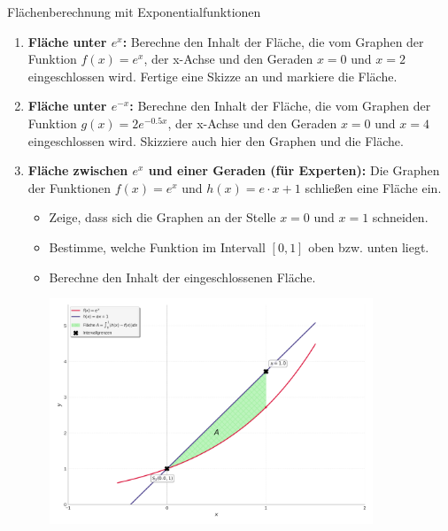 \begin{aufgabenumgebung}{Flächenberechnung mit Exponentialfunktionen}
\begin{enumerate}
    \item \textbf{Fläche unter $e^x$:}
        Berechne den Inhalt der Fläche, die vom Graphen der Funktion $f(x) = e^x$, der x-Achse und den Geraden $x=0$ und $x=2$ eingeschlossen wird. Fertige eine Skizze an und markiere die Fläche.
    \item \textbf{Fläche unter $e^{-x}$:}
        Berechne den Inhalt der Fläche, die vom Graphen der Funktion $g(x) = 2e^{-0.5x}$, der x-Achse und den Geraden $x=0$ und $x=4$ eingeschlossen wird. Skizziere auch hier den Graphen und die Fläche.
    \item \textbf{Fläche zwischen $e^x$ und einer Geraden (für Experten):}
        Die Graphen der Funktionen $f(x) = e^x$ und $h(x) = e\cdot x + 1$ schließen eine Fläche ein.
        \begin{itemize}
            \item Zeige, dass sich die Graphen an der Stelle $x=0$ und $x=1$ schneiden.
            \item Bestimme, welche Funktion im Intervall $[0,1]$ oben bzw. unten liegt.
            \item Berechne den Inhalt der eingeschlossenen Fläche.
                \begin{center}
                    \includegraphics[width=0.8\textwidth]{grafiken/Integral_Flaeche_ex_Gerade.png}
                    \label{fig:flaeche_ex_gerade}
                \end{center}
        \end{itemize}
\end{enumerate}
\end{aufgabenumgebung}

